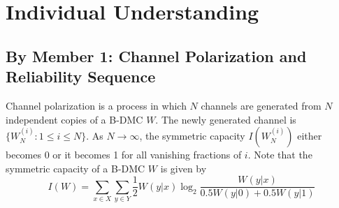 \documentclass{report}
\begin{document}
\section*{Individual Understanding}
\subsection*{By Member 1: Channel Polarization and Reliability Sequence}
Channel polarization is a process in which $N$ channels are generated from $N$ independent copies of a B-DMC $W$. The newly generated channel is $\{W_{N}^{(i)}: 1 \leq i \leq N \}$. As $N \rightarrow \infty$, the symmetric capacity $I(W_{N}^{(i)})$ either becomes 0 or it becomes 1 for all vanishing fractions of $i$. Note that the symmetric capacity of a B-DMC $W$ is given by
\begin{equation}
I(W) = \sum_{x \in X}\sum_{y \in Y}\frac{1}{2}W(y|x)\log_{2}\frac{W(y|x)}{0.5W(y|0) + 0.5W(y|1)}
\end{equation}
\end{document}
